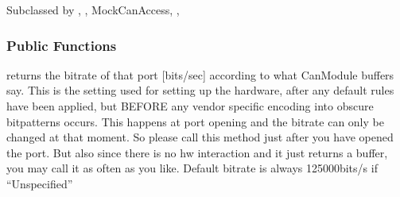 \documentclass[a4paper,10pt,english]{sphinxmanual}
\begin{document}
\begin{fulllineitems}
\label{\detokenize{canports:_CPPv4N9CanModule10CCanAccessE}}%
\pysigstartmultiline
{}%
\pysigstopmultiline
Subclassed by {\hyperref[\detokenize{vendors/anagate:classAnaCanScan}]{}}, {\hyperref[\detokenize{vendors/systec:classCSockCanScan}]{}}, MockCanAccess, {\hyperref[\detokenize{vendors/peak:classPKCanScan}]{}}, {\hyperref[\detokenize{vendors/systec:classSTCanScan}]{}}
\subsubsection*{Public Functions}

\begin{fulllineitems}
\label{\detokenize{canports:_CPPv4N9CanModule10CCanAccess14getPortBitrateEv}}%
\pysigstartmultiline
{}%
\pysigstopmultiline
returns the bitrate of that port {[}bits/sec{]} according to what CanModule buffers say. This is the setting used for setting up the hardware, after any default rules have been applied, but BEFORE any vendor specific encoding into obscure bitpatterns occurs. This happens at port opening and the bitrate can only be changed at that moment. So please call this method just after you have opened the port. But also since there is no hw interaction and it just returns a buffer, you may call it as often as you like. Default bitrate is always 125000bits/s if “Unspecified” 

\end{fulllineitems}


\end{fulllineitems}
\end{document}
